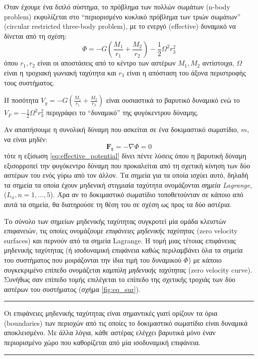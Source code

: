 Όταν έχουμε ένα διπλό σύστημα, το πρόβλημα των πολλών σωμάτων (n-body problem) εκφυλίζεται στο ``περιορισμένο κυκλικό πρόβλημα των τριών σωμάτων'' (circular restricted three-body problem), με το ενεργό (effective) δυναμικό να δίνεται από τη σχέση:
\begin{equation}
    \label{eq:effective_potential}
    \Phi = - G \left( \frac{M_1}{r_1} + \frac{M_2}{r_2} \right) - \frac{1}{2} \Omega^2 r_3^2
\end{equation}
όπου  $r_1, r_2$ είναι οι αποστάσεις από το κέντρο των αστέρων $M_1, M_2$ αντίστοιχα, $\Omega$ είναι η τροχιακή γωνιακή ταχύτητα και $r_3$ είναι η απόσταση του άξονα περιστροφής τους συστήματος.

Η ποσότητα $\displaystyle V_g = - G \left( \frac{M_1}{r_1} + \frac{M_2}{r_2} \right)$ είναι ουσιαστικά το βαρυτικό δυναμικό ενώ το $\displaystyle V_F = - \frac{1}{2} \Omega^2 r_3^2$ περιγράφει το ``δυναμικό'' της φυγόκεντρου δύναμης. 

Αν απαιτήσουμε η συνολική δύναμη που ασκείται σε ένα δοκιμαστικό σωματίδιο, $m$, να είναι μηδέν: $$\boldsymbol{F_t} = - \nabla \Phi = 0$$
τότε η εξίσωση \eqref{eq:effective_potential} δίνει πέντε λύσεις όπου η βαρυτική δύναμη εξισορροπεί την φυγόκεντρο δύναμη που προκαλείται από τη σχετική κίνηση των δύο αστέρων του ενός γύρω από τον άλλον. Τα σημεία για τα οποία ισχύει αυτό, δηλαδή τα σημεία τα οποία έχουν μηδενική στιγμιαία ταχύτητα ονομάζονται \textit{σημεία Lagrange}, ($L_n, n = 1, \dots, 5$). Άρα αν το δοκιμαστικό σωματίδιο τοποθετούνταν σε κάποιο από αυτά τα σημεία, θα διατηρούσε τη θέση του σε σχέση ως προς τα δύο αστέρια.

Το σύνολο των σημείων μηδενικής ταχύτητας συγκροτεί μία ομάδα κλειστών επιφανειών, τις οποίες ονομάζουμε \textit{επιφάνειες μηδενικής ταχύτητας} (zero velocity surfaces) και περνούν από τα σημεία Lagrange. Η τομή μιας τέτοιας επιφάνειας μηδενικής ταχύτητας (ή ισοδυναμική επιφάνεια καθώς περιλαμβάνει όλα τα σημεία του συστήματος που μοιράζονται την ίδια τιμή του δυναμικού $\Phi$) με κάποιο συγκεκριμένο επίπεδο ονομάζεται \textit{καμπύλη μηδενικής ταχύτητας} (zero velocity curve). Συνήθως σαν επίπεδο τομής επιλέγεται το επίπεδο της σχετικής τροχιάς των δύο αστέρων του συστήματος (σχήμα \ref{fig:eq_sur}).
\\
{\color{red} \hrule}
Οι επιφάνειες μηδενικής ταχύτητας είναι σημαντικές γιατί ορίζουν τα όρια (boundaries) των περιοχών από τις οποίες το δοκιμαστικό σωματίδιο είναι δυναμικά αποκλεισμένο. Με άλλα λόγια, κάθε αστέρας ελέγχει βαρυτικά μόνο έναν περιορισμένο χώρο που καθορίζεται από μία ισοδυναμική επιφάνεια.\\
{\color{red} \hrule}

